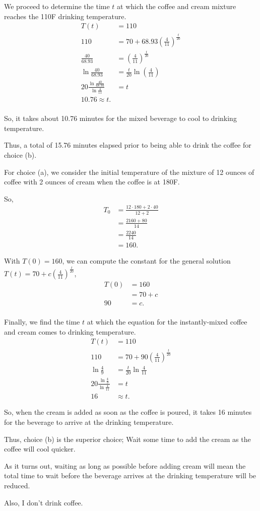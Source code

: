 \documentclass[../hw11]{subfiles}
\begin{document}
We proceed to determine the time $t$ at which the coffee and cream mixture reaches the 110F drinking temperature.
\begin{align*}
    T(t)&=110\\
    110&=70+68.93{\left( \frac{4}{11} \right)}^{\frac{t}{20}} \\
    \frac{40}{68.93}&={\left( \frac{4}{11} \right)}^{\frac{t}{20}} \\
    \ln{\frac{40}{68.93}}&=\frac{t}{20}\ln{\left( \frac{4}{11} \right)} \\
    20\frac{\ln{\frac{40}{68.93}}}{\ln{\frac{4}{11}}}&=t \\
    10.76\approx t. \\
\end{align*}

So, it takes about 10.76 minutes for the mixed beverage to cool to drinking temperature.

Thus, a total of 15.76 minutes elapsed prior to being able to drink the coffee for choice (b).

For choice (a), we consider the initial temperature of the mixture of 12 ounces of coffee with 2 ounces of cream when the coffee is at 180F.

So,
\begin{align*}
    T_0&=\frac{12\cdot180+2\cdot40}{12+2} \\
    &= \frac{2160+80}{14} \\
    &= \frac{2240}{14} \\
    &= 160.
\end{align*}

With $T(0)=160$, we can compute the constant for the general solution $T(t)=70+c{\left( \frac{4}{11} \right)}^{\frac{t}{20}}$,
\begin{align*}
    T(0)&=160 \\
    &=70+c \\
    90&=c. \\
\end{align*}

Finally, we find the time $t$ at which the equation for the instantly-mixed coffee and cream comes to drinking temperature.
\begin{align*}
    T(t)&=110 \\
    110&=70+90{\left( \frac{4}{11} \right)}^{\frac{t}{20}}\\
    \ln{\frac{4}{9}}&=\frac{t}{20}\ln{\frac{4}{11}} \\
    20\frac{\ln{\frac{4}{9}}}{\ln{\frac{4}{11}}}&=t \\
    16&\approx t.
\end{align*}

So, when the cream is added as soon as the coffee is poured, it takes 16 minutes for the beverage to arrive at the drinking temperature.

Thus, choice (b) is the superior choice; Wait some time to add the cream as the coffee will cool quicker.

As it turns out, waiting as long as possible before adding cream will mean the total time to wait before the beverage arrives at the drinking temperature will be reduced.

Also, I don't drink coffee.
\end{document}
